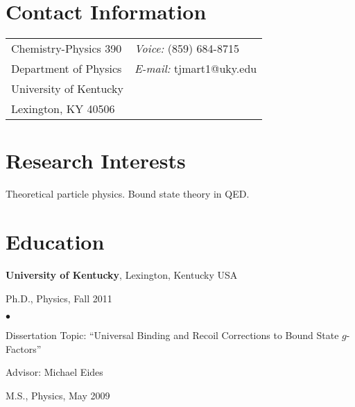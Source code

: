 \documentclass[margin,line]{res}
\newenvironment{list1}{
  \begin{list}{\ding{113}}{%
      \setlength{\itemsep}{0in}
      \setlength{\parsep}{0in} \setlength{\parskip}{0in}
      \setlength{\topsep}{0in} \setlength{\partopsep}{0in} 
      \setlength{\leftmargin}{0.17in}}}{\end{list}}
\newenvironment{list2}{
  \begin{list}{$\bullet$}{%
      \setlength{\itemsep}{0in}
      \setlength{\parsep}{0in} \setlength{\parskip}{0in}
      \setlength{\topsep}{0in} \setlength{\partopsep}{0in} 
      \setlength{\leftmargin}{0.2in}}}{\end{list}}
\begin{document}

\begin{resume}
\section{\sc Contact Information}
\vspace{.05in}
\begin{tabular}{@{}p{2in}p{4in}}
Chemistry-Physics 390            & {\it Voice:}  (859) 684-8715 \\            
Department of Physics   & {\it E-mail:}  tjmart1@uky.edu\\         
University of Kentucky & \\    
Lexington, KY 40506  &     \\
\end{tabular}


\section{\sc Research Interests}
Theoretical particle physics.  Bound state theory in QED.

\section{\sc Education}
{\bf University of Kentucky}, Lexington, Kentucky USA\\
\vspace*{-.1in}
\begin{list1}
\item[] Ph.D., Physics, Fall 2011
\begin{list2}
\vspace*{.05in}
\item Dissertation Topic:  ``Universal Binding and Recoil Corrections to Bound State $g$-Factors''
\item Advisor:  Michael Eides
\end{list2}
\vspace*{.05in}
\item[] M.S., Physics,  May 2009
\end{list1}


\end{resume}
\end{document}
